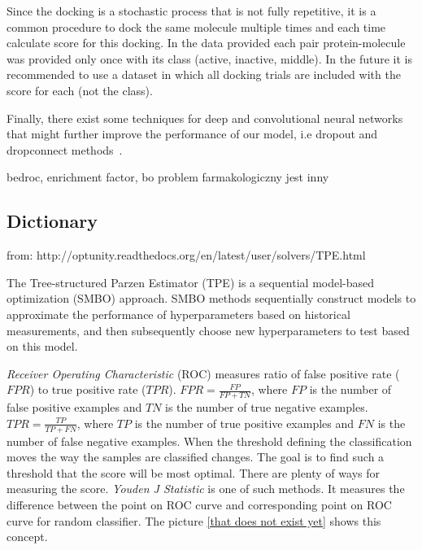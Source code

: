 \documentclass[a4paper,10pt]{report}
\begin{document}
      Since the docking is a stochastic process that is not fully repetitive, it is a common procedure to dock the same molecule multiple times and each time calculate score for this docking. In the data provided each pair protein-molecule was provided only once with its class (active, inactive, middle). In the future it is recommended to use a dataset in which all docking trials are included with the score for each (not the class).
      
      Finally, there exist some techniques for deep and convolutional neural networks that might further improve the performance of our model, i.e dropout and dropconnect methods~\cite{DUTCH}.
      
      bedroc, enrichment factor, bo problem farmakologiczny jest inny

   \begin{appendices}
    \chapter{Dictionary}\label{appendiks}
      from: http://optunity.readthedocs.org/en/latest/user/solvers/TPE.html 
      
      The Tree-structured Parzen Estimator (TPE) is a sequential model-based optimization (SMBO) approach. SMBO methods sequentially construct models to approximate the performance of hyperparameters based on historical measurements, and then subsequently choose new hyperparameters to test based on this model. 
      
      \emph{Receiver Operating Characteristic} (ROC) measures ratio of false positive rate ($FPR$) to true positive rate ($TPR$). $FPR = \frac{FP}{FP + TN}$, where $FP$ is the number of false positive examples and $TN$ is the number of true negative examples. $TPR = \frac{TP}{TP + FN}$, where $TP$ is the number of true positive examples and $FN$ is the number of false negative examples. When the threshold defining the classification moves the way the samples are classified changes. The goal is to find such a threshold that the score will be most optimal. There are plenty of ways for measuring the score. \emph{Youden J Statistic} is one of such methods. It measures the difference between the point on ROC curve and corresponding point on ROC curve for random classifier. The picture \ref{that does not exist yet} shows this concept.
      
  \end{appendices}
      
\end{document}
